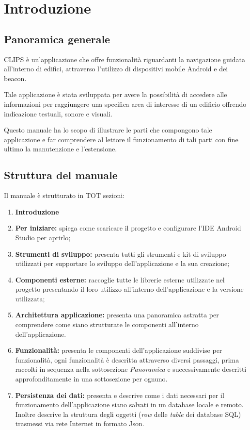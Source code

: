 \documentclass[../ManualeSviluppatore.tex]{subfiles}
\begin{document}
\section{Introduzione}
\label{sec:Introduzione}
	\subsection{Panoramica generale}
	
	CLIPS è un'applicazione che offre funzionalità riguardanti la navigazione guidata all'interno di edifici, attraverso l'utilizzo di dispositivi mobile Android e dei beacon.
	
	Tale applicazione è stata sviluppata per avere la possibilità di accedere alle informazioni per raggiungere una specifica area di interesse di un edificio offrendo indicazione testuali, sonore e visuali.
	
	Questo manuale ha lo scopo di illustrare le parti che compongono tale applicazione e far comprendere al lettore il funzionamento di tali parti con fine ultimo la manutenzione e l'estensione.
	
	\subsection{Struttura del manuale}
		Il manuale è strutturato in TOT sezioni:
		\begin{enumerate}
			\item \textbf{Introduzione}
			\item \textbf{Per iniziare:} spiega come scaricare il progetto e configurare l'IDE Android Studio per aprirlo;
			\item \textbf{Strumenti di sviluppo:} presenta tutti gli strumenti e kit di sviluppo utilizzati per supportare lo sviluppo dell'applicazione e la sua creazione;
			\item \textbf{Componenti esterne:} raccoglie tutte le librerie esterne utilizzate nel progetto presentando il loro utilizzo all'interno dell'applicazione e la versione utilizzata;
			\item \textbf{Architettura applicazione:} presenta una panoramica astratta per comprendere come siano strutturate le componenti all'interno dell'applicazione.
			\item \textbf{Funzionalità:} presenta le componenti dell'applicazione suddivise per funzionalità, ogni funzionalità è descritta attraverso diversi passaggi, prima raccolti in sequenza nella sottosezione \textit{Panoramica} e successivamente descritti approfonditamente in una sottosezione per ognuno.
			\item \textbf{Persistenza dei dati:} presenta e descrive come i dati necessari per il funzionamento dell'applicazione siano salvati in un database locale e remoto. Inoltre descrive la struttura degli oggetti (\textit{row} delle \textit{table} dei database SQL) trasmessi via rete Internet in formato Json.
			
		\end{enumerate}
	
\end{document}
